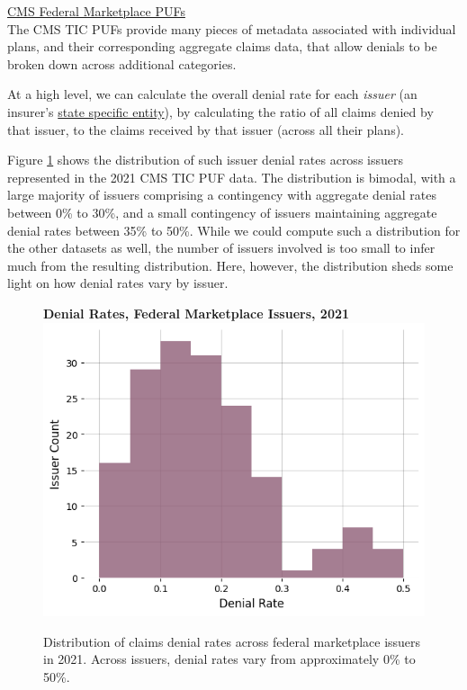 \documentclass[12pt, a4paper,twoside]{report}
\theoremstyle{plain} %
\theoremstyle{definition} %
\theoremstyle{remark} %
\numberwithin{equation}{chapter}
\begin{document}
		
		
		\underline{CMS Federal Marketplace PUFs}\\
		
		The CMS TIC PUFs provide many pieces of metadata associated with individual plans, and their corresponding aggregate claims data, that allow denials to be broken down across additional categories.
		
		At a high level, we can calculate the overall denial rate for each \emph{issuer} (an insurer's \href{https://www.law.cornell.edu/definitions/uscode.php?width=840&height=800&iframe=true&def_id=26-USC-392827901-289353966&term_occur=1&term_src=}{state specific entity}), by calculating the ratio of all claims denied by that issuer, to the claims received by that issuer (across all their plans).
		
		Figure \ref{federalissuerdenialdist} shows the distribution of such issuer denial rates across issuers represented in the 2021 CMS TIC PUF data. The distribution is bimodal, with a large majority of issuers comprising a contingency with aggregate denial rates between 0\% to 30\%, and a small contingency of issuers maintaining aggregate denial rates between 35\% to 50\%. While we could compute such a distribution for the other datasets as well, the number of issuers involved is too small to infer much from the resulting distribution. Here, however, the distribution sheds some light on how denial rates vary by issuer.
		
		
		\begin{figure}[h!]
			\centering
			\textbf{Denial Rates, Federal Marketplace Issuers, 2021}
			\includegraphics[width=\columnwidth]{images/cms_puf/denial_rates_all_insurers.png}
			\caption{Distribution of claims denial rates across federal marketplace issuers in 2021. Across issuers, denial rates vary from approximately 0\% to 50\%.}
			\label{federalissuerdenialdist}
		\end{figure}
	
\end{document}
